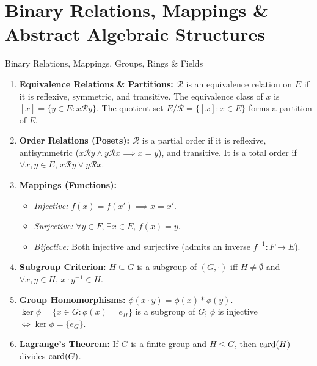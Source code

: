 \chapter{Binary Relations, Mappings \& Abstract Algebraic Structures}
\label{chap:exo_ch02}

\begin{quicksummary}{Binary Relations, Mappings, Groups, Rings \& Fields}
\begin{enumerate}[leftmargin=1.4em,itemsep=3pt]
  \item \textbf{Equivalence Relations \& Partitions:}
  $\mathcal{R}$ is an equivalence relation on $E$ if it is reflexive, symmetric, and transitive.
  The equivalence class of $x$ is $[x] = \{y \in E : x \mathcal{R} y\}$. The quotient set $E/\mathcal{R} = \{[x] : x \in E\}$ forms a partition of $E$.
  \item \textbf{Order Relations (Posets):}
  $\mathcal{R}$ is a partial order if it is reflexive, antisymmetric ($x \mathcal{R} y \land y \mathcal{R} x \implies x = y$), and transitive. It is a total order if $\forall x, y \in E$, $x \mathcal{R} y \lor y \mathcal{R} x$.
  \item \textbf{Mappings (Functions):}
  \begin{itemize}[leftmargin=1.2em,itemsep=1pt]
    \item \textit{Injective:} $f(x) = f(x') \implies x = x'$.
    \item \textit{Surjective:} $\forall y \in F,\, \exists x \in E,\, f(x) = y$.
    \item \textit{Bijective:} Both injective and surjective (admits an inverse $f^{-1}: F \to E$).
  \end{itemize}
  \item \textbf{Subgroup Criterion:}
  $H \subseteq G$ is a subgroup of $(G, \cdot)$ iff $H \ne \emptyset$ and $\forall x, y \in H,\, x \cdot y^{-1} \in H$.
  \item \textbf{Group Homomorphisms:}
  $\phi(x \cdot y) = \phi(x) * \phi(y)$. $\ker \phi = \{x \in G : \phi(x) = e_H\}$ is a subgroup of $G$; $\phi$ is injective $\iff \ker \phi = \{e_G\}$.
  \item \textbf{Lagrange's Theorem:}
  If $G$ is a finite group and $H \le G$, then $\operatorname{card}(H)$ divides $\operatorname{card}(G)$.
\end{enumerate}
\end{quicksummary}

\vspace{10pt}

